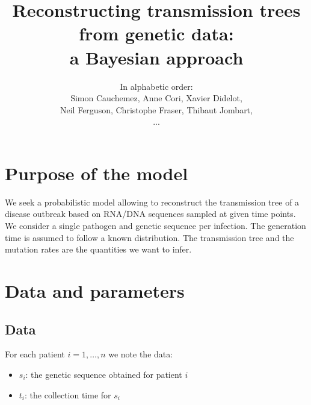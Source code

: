 \documentclass[10pt]{article}
\author{In alphabetic order: \\Simon Cauchemez, Anne Cori, Xavier Didelot, \\Neil Ferguson, Christophe Fraser, Thibaut Jombart,\\...}
\title{Reconstructing transmission trees from genetic data: \\a Bayesian approach}
\begin{document}
\maketitle

\section*{Purpose of the model}
We seek a probabilistic model allowing to reconstruct the transmission tree of a disease outbreak based on RNA/DNA sequences sampled at given time points.
We consider a single pathogen and genetic sequence per infection.
The generation time is assumed to follow a known distribution.
The transmission tree and the mutation rates are the quantities we want to infer.



\section*{Data and parameters}

\subsection*{Data}
For each patient $i=1,\ldots,n$ we note the data:
\begin{itemize}
	\item $s_i$: the genetic sequence obtained for patient $i$
	\item $t_i$: the collection time for $s_i$
\end{itemize}
\end{document}
